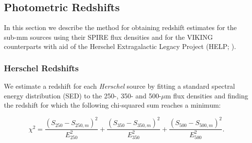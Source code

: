 \documentclass[fleqn,usenatbib]{mnras}
\begin{document}
\subsection{Photometric Redshifts}
\label{sec:photometric_redshifts}

In this section we describe the method for obtaining redshift estimates for the sub-mm sources using their SPIRE flux densities and for the VIKING counterparts with aid of the Herschel Extragalactic Legacy Project (HELP; \citealp{Vaccari_2016}). 

\subsubsection{Herschel Redshifts}
\label{sec:herschel_redshifts}

We estimate a redshift for each \textit{Herschel} source by fitting a standard spectral energy distribution (SED) to the 250-, 350- and 500-$\mu$m flux densities and finding the redshift for which the following chi-squared sum reaches a minimum:

\begin{equation}
\label{eq:chi_square}
\chi^2 = \frac{(S_{250} - S_{250, m})^2}{E_{250}^2} + \frac{(S_{350} - S_{350, m})^2}{E_{350}^2} + \frac{(S_{500} - S_{500, m})^2}{E_{500}^2}.
\end{equation}
\end{document}
